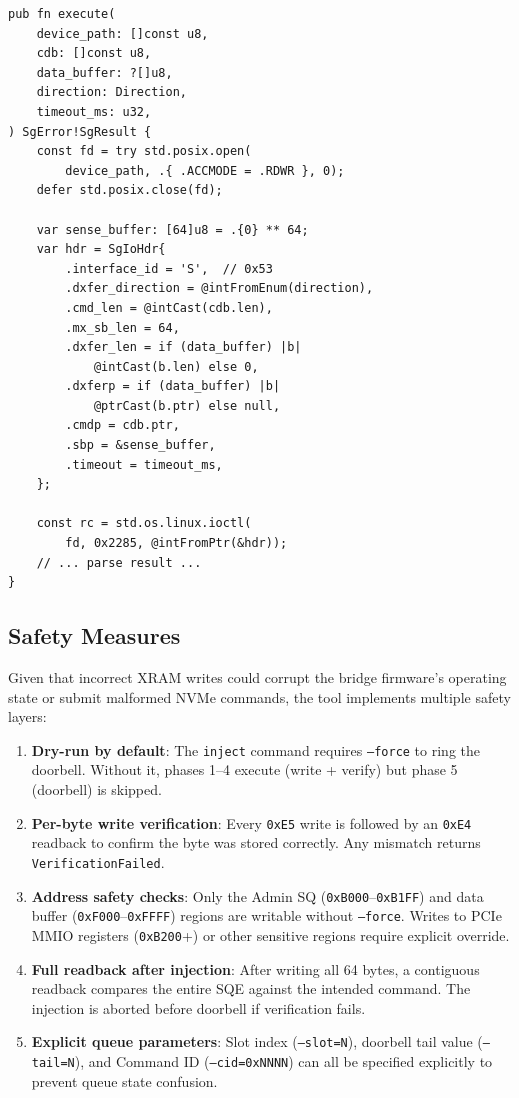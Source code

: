 \documentclass[conference]{IEEEtran}
\begin{document}
\begin{lstlisting}[language=Zig,caption={SG\_IO ioctl execution
(simplified from sg\_io.zig).},label={lst:sgio}]
pub fn execute(
    device_path: []const u8,
    cdb: []const u8,
    data_buffer: ?[]u8,
    direction: Direction,
    timeout_ms: u32,
) SgError!SgResult {
    const fd = try std.posix.open(
        device_path, .{ .ACCMODE = .RDWR }, 0);
    defer std.posix.close(fd);

    var sense_buffer: [64]u8 = .{0} ** 64;
    var hdr = SgIoHdr{
        .interface_id = 'S',  // 0x53
        .dxfer_direction = @intFromEnum(direction),
        .cmd_len = @intCast(cdb.len),
        .mx_sb_len = 64,
        .dxfer_len = if (data_buffer) |b|
            @intCast(b.len) else 0,
        .dxferp = if (data_buffer) |b|
            @ptrCast(b.ptr) else null,
        .cmdp = cdb.ptr,
        .sbp = &sense_buffer,
        .timeout = timeout_ms,
    };

    const rc = std.os.linux.ioctl(
        fd, 0x2285, @intFromPtr(&hdr));
    // ... parse result ...
}
\end{lstlisting}


\subsection{Safety Measures}
\label{sec:safety}

Given that incorrect XRAM writes could corrupt the bridge firmware's
operating state or submit malformed NVMe commands, the tool implements
multiple safety layers:

\begin{enumerate}
\item \textbf{Dry-run by default}: The \texttt{inject} command requires
  \texttt{--force} to ring the doorbell. Without it, phases 1--4 execute
  (write + verify) but phase 5 (doorbell) is skipped.

\item \textbf{Per-byte write verification}: Every \texttt{0xE5} write is
  followed by an \texttt{0xE4} readback to confirm the byte was stored
  correctly. Any mismatch returns \texttt{VerificationFailed}.

\item \textbf{Address safety checks}: Only the Admin SQ
  (\texttt{0xB000}--\texttt{0xB1FF}) and data buffer
  (\texttt{0xF000}--\texttt{0xFFFF}) regions are writable without
  \texttt{--force}. Writes to PCIe MMIO registers (\texttt{0xB200}+)
  or other sensitive regions require explicit override.

\item \textbf{Full readback after injection}: After writing all 64 bytes,
  a contiguous readback compares the entire SQE against the intended
  command. The injection is aborted before doorbell if verification
  fails.

\item \textbf{Explicit queue parameters}: Slot index
  (\texttt{--slot=N}), doorbell tail value (\texttt{--tail=N}), and
  Command ID (\texttt{--cid=0xNNNN}) can all be specified explicitly
  to prevent queue state confusion.
\end{enumerate}
\end{document}
